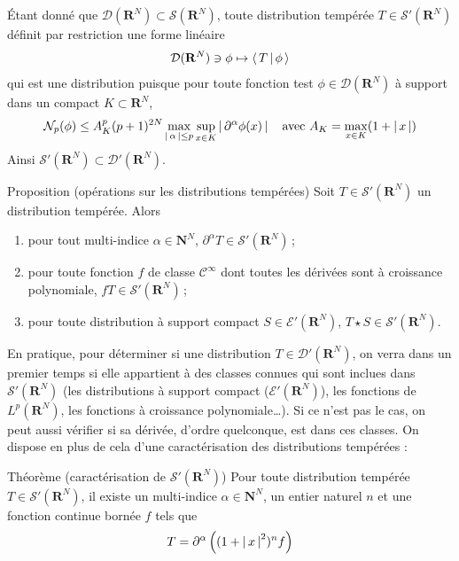         Étant donné que $\mathcal{D}(\mathbf{R}^N) \subset \mathcal{S}(\mathbf{R}^N)$, toute distribution tempérée $T \in \mathcal{S}'(\mathbf{R}^N)$ définit par restriction une forme linéaire 
        \[ \mathcal{D}(\mathbf{R}^N) \ni \phi \mapsto \left< \, T \, \middle| \, \phi \, \right> \]   
        qui est une distribution puisque pour toute fonction test $\phi \in \mathcal{D}(\mathbf{R}^N)$ à support dans un compact $K \subset \mathbf{R}^N$, 
        \[ \mathcal{N}_p(\phi) \leq A_K^p(p + 1)^{2N} \max_{\left\lvert \, \alpha \, \right\rvert \leq p} \sup_{x \in K} \left\lvert \, \partial^{\alpha} \phi(x) \, \right\rvert \quad \text{avec } A_K = \max_{x \in K}(1 + \left\lvert \, x \, \right\rvert) \]   
        Ainsi $\mathcal{S}'(\mathbf{R}^N) \subset \mathcal{D}'(\mathbf{R}^N)$.

        \begin{omed}{Proposition (opérations sur les distributions tempérées)}
            Soit $T \in \mathcal{S}'(\mathbf{R}^N)$ un distribution tempérée. Alors 
            \begin{enumerate}[label=($p_{\arabic*}$)]
                \item pour tout multi-indice $\alpha \in \mathbf{N}^N$, $\partial^{\alpha} T \in \mathcal{S}'(\mathbf{R}^N)$ ;
                \item pour toute fonction $f$ de classe $\mathcal{C}^{\infty}$ dont toutes les dérivées sont à croissance polynomiale, $fT \in \mathcal{S}'(\mathbf{R}^N)$ ;
                \item pour toute distribution à support compact $S \in \mathcal{E}'(\mathbf{R}^N)$, $T \star S \in \mathcal{S}'(\mathbf{R}^N)$.
            \end{enumerate}
        \end{omed}

        En pratique, pour déterminer si une distribution $T \in \mathcal{D}'(\mathbf{R}^N)$, on verra dans un premier temps si elle appartient à des classes connues qui sont inclues dans $\mathcal{S}'(\mathbf{R}^N)$ (les distributions à support compact ($\mathcal{E}'(\mathbf{R}^N)$), les fonctions de $L^p(\mathbf{R}^N)$, les fonctions à croissance polynomiale\ldots). Si ce n’est pas le cas, on peut aussi vérifier si sa dérivée, d’ordre quelconque, est dans ces classes. On dispose en plus de cela d’une caractérisation des distributions tempérées :

        \begin{omed}{Théorème (caractérisation de $\mathcal{S}'(\mathbf{R}^N)$)}
            Pour toute distribution tempérée $T \in \mathcal{S}'(\mathbf{R}^N)$, il existe un multi-indice $\alpha \in \mathbf{N}^N$, un entier naturel $n$ et une fonction continue bornée $f$ tels que 
            \[ T = \partial^\alpha\left((1 + \left\lvert \, x \, \right\rvert^2)^n f\right) \]   
        \end{omed}

